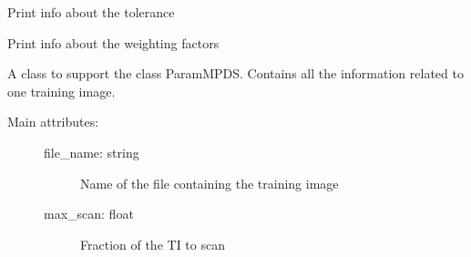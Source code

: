 \documentclass[letterpaper,10pt,english]{sphinxmanual}
\begin{document}
\begin{fulllineitems}
\begin{fulllineitems}
\label{\detokenize{appendices:s2Dcd.deesse.Param.print_tol}}
Print info about the tolerance

\end{fulllineitems}


\begin{fulllineitems}
\label{\detokenize{appendices:s2Dcd.deesse.Param.print_weight}}
Print info about the weighting factors

\end{fulllineitems}


\end{fulllineitems}


\begin{fulllineitems}
\label{\detokenize{appendices:s2Dcd.deesse.TiInfo}}
A class to support the class ParamMPDS. Contains all the information
related to one training image.
\begin{description}
\item[{Main attributes:}] \leavevmode\begin{description}
\item[{file\_name: string}] \leavevmode
Name of the file containing the training image

\item[{max\_scan: float}] \leavevmode
Fraction of the TI to scan

\end{description}

\end{description}

\end{fulllineitems}

\end{document}
